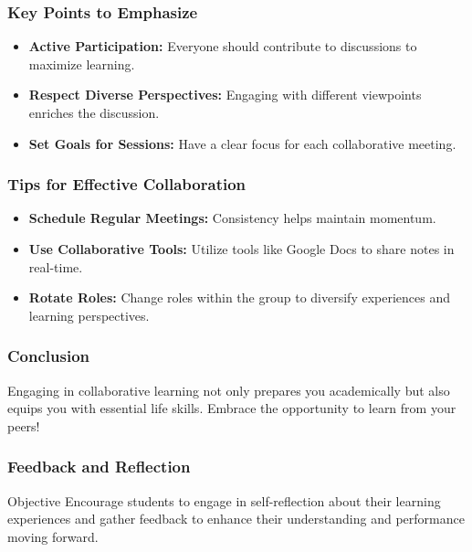 \documentclass[aspectratio=169]{beamer}
\begin{document}
\begin{frame}[fragile]
    \frametitle{Key Points to Emphasize}
    \begin{itemize}
        \item \textbf{Active Participation:} Everyone should contribute to discussions to maximize learning.
        \item \textbf{Respect Diverse Perspectives:} Engaging with different viewpoints enriches the discussion.
        \item \textbf{Set Goals for Sessions:} Have a clear focus for each collaborative meeting.
    \end{itemize}
\end{frame}

\begin{frame}[fragile]
    \frametitle{Tips for Effective Collaboration}
    \begin{itemize}
        \item \textbf{Schedule Regular Meetings:} Consistency helps maintain momentum.
        \item \textbf{Use Collaborative Tools:} Utilize tools like Google Docs to share notes in real-time.
        \item \textbf{Rotate Roles:} Change roles within the group to diversify experiences and learning perspectives.
    \end{itemize}
\end{frame}

\begin{frame}[fragile]
    \frametitle{Conclusion}
    Engaging in collaborative learning not only prepares you academically but also equips you with essential life skills. Embrace the opportunity to learn from your peers!
\end{frame}

\begin{frame}[fragile]
    \frametitle{Feedback and Reflection}
    \begin{block}{Objective}
        Encourage students to engage in self-reflection about their learning experiences and gather feedback to enhance their understanding and performance moving forward.
    \end{block}
\end{frame}
\end{document}
